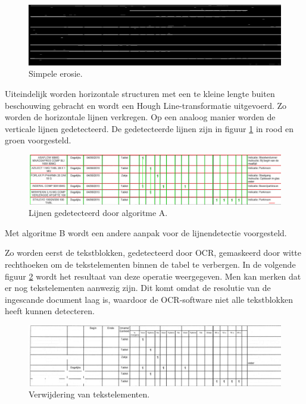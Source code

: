 \begin{figure}[H]
    \centering
    \includegraphics[width=1\textwidth]{img/line_detection_a_6_erode_image_for_horizontal_lines.png}
    \caption{Simpele erosie.}
\end{figure}

Uiteindelijk worden horizontale structuren met een te kleine lengte buiten beschouwing gebracht en wordt een Hough Line-transformatie uitgevoerd. Zo worden de horizontale lijnen verkregen. Op een analoog manier worden de verticale lijnen gedetecteerd. De gedetecteerde lijnen zijn in figuur \ref{fig:lines-detected-a} in rood en groen voorgesteld.

\begin{figure}[H]
    \centering
    \includegraphics[width=1\textwidth]{img/lines_detected_a.png}
    \caption{Lijnen gedetecteerd door algoritme A.}
    \label{fig:lines-detected-a}
\end{figure}

Met algoritme B wordt een andere aanpak voor de lijnendetectie voorgesteld.

Zo worden eerst de tekstblokken, gedetecteerd door \Gls{OCR}, gemaskeerd door witte rechthoeken om de tekstelementen binnen de tabel te verbergen. In de volgende figuur \ref{fig:line-detection-b-text-removed} wordt het resultaat van deze operatie weergegeven. Men kan merken dat er nog tekstelementen aanwezig zijn. Dit komt omdat de resolutie van de ingescande document laag is, waardoor de \Gls{OCR}-software niet alle tekstblokken heeft kunnen detecteren.

\begin{figure}[H]
    \centering
    \includegraphics[width=1\textwidth]{img/line_detection_b_1_detected_text_removed.png}
    \caption{Verwijdering van tekstelementen.}
    \label{fig:line-detection-b-text-removed}
\end{figure}

